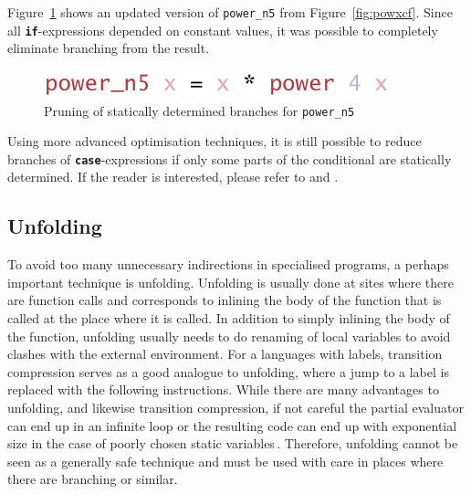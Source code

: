 \documentclass{ituthesis}
\newcommand{\ttdec}[1]{\textcolor{declared-var-color}{\texttt{#1}}}
\theoremstyle{break}
\begin{document}
Figure~\ref{fig:powxbp} shows an updated version of \ttdec{power\_n5} from Figure~\ref{fig:powxcf}.
Since all \texttt{\textbf{if}}-expressions depended on constant values, it was possible to completely eliminate branching from the result.

\begin{figure}[ht]
\begin{center}
    \includegraphics[scale=0.5]{Figures/PowerExampleBranchPruning.png}
\end{center}
\caption{Pruning of statically determined branches for \ttdec{power\_n5}}
\label{fig:powxbp}
\end{figure}

Using more advanced optimisation techniques, it is still possible to reduce branches of \texttt{\textbf{case}}-expressions if only some parts of the conditional are statically determined. If the reader is interested, please refer to \textcite{PeytonJones:1992:IFL:129390} and \textcite{boquist1999code}.

\subsection{Unfolding}
\label{sub:Unfolding}
To avoid too many unnecessary indirections in specialised programs, a perhaps important technique is unfolding.
Unfolding is usually done at sites where there are function calls and corresponds to inlining the body of the function that is called at the place where it is called.
In addition to simply inlining the body of the function, unfolding usually needs to do renaming of local variables to avoid clashes with the external environment.
For a languages with labels, transition compression serves as a good analogue to unfolding, where a jump to a label is replaced with the following instructions.
While there are many advantages to unfolding, and likewise transition compression, if not careful the partial evaluator can end up in an infinite loop or the resulting code can end up with exponential size in the case of poorly chosen static variables\,\autocite{Jones:1993:PEA:153676}.
Therefore, unfolding cannot be seen as a generally safe technique and must be used with care in places where there are branching or similar.
\end{document}
